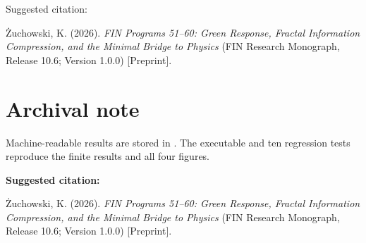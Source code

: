 \documentclass[11pt,a4paper,openany]{report}
\begin{document}
Suggested citation:

Żuchowski, K. (2026). \emph{FIN Programs 51–60: Green Response, Fractal Information Compression, and the Minimal Bridge to Physics} (FIN Research Monograph, Release 10.6; Version 1.0.0) [Preprint].


\clearpage
\chapter*{Archival note}
Machine-readable results are stored in
. The executable
and ten regression tests reproduce the finite results and all four figures.

\medskip
\noindent\textbf{Suggested citation:}

\.Zuchowski, K. (2026). \emph{FIN Programs 51--60: Green Response,
Fractal Information Compression, and the Minimal Bridge to Physics}
(FIN Research Monograph, Release 10.6; Version 1.0.0) [Preprint].
\end{document}
